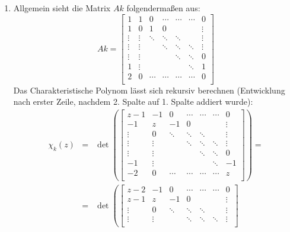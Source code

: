 \begin{enumerate}
\item Allgemein sieht die Matrix $Ak$ folgendermaßen aus:
	\[ Ak = \begin{bmatrix}
			1      & 1      & 0      & \cdots & \cdots & \cdots & 0      \\
			1      & 0      & 1      & 0      &        &        & \vdots \\
			\vdots & \vdots & \ddots & \ddots & \ddots &        & \vdots \\
			\vdots & \vdots &        & \ddots & \ddots & \ddots & \vdots \\
			\vdots & \vdots &        &        & \ddots & \ddots & 0      \\
			1      & \vdots &        &        &        & \ddots & 1      \\
			2      & 0      & \cdots & \cdots & \cdots & \cdots & 0      \\
		\end{bmatrix} \]
	Das Charakteristische Polynom lässt sich rekursiv berechnen (Entwicklung nach erster Zeile,
	nachdem 2. Spalte auf 1. Spalte addiert wurde):
	\begin{eqnarray*}
		\chi_k(z) &=& \det \left(
				\begin{bmatrix}
					z-1    & -1     & 0      & \cdots & \cdots & \cdots & 0      \\
					-1     & z      & -1     & 0      &        &        & \vdots \\
					\vdots & 0      & \ddots & \ddots & \ddots &        & \vdots \\
					\vdots & \vdots &        & \ddots & \ddots & \ddots & \vdots \\
					\vdots & \vdots &        &        & \ddots & \ddots & 0      \\
					-1     & \vdots &        &        &        & \ddots & -1     \\
					-2     & 0      & \cdots & \cdots & \cdots & \cdots & z      \\
				\end{bmatrix} \right) = \\
			&=& \det \left(
				\begin{bmatrix}
					z-2    & -1     & 0      & \cdots & \cdots & \cdots & 0      \\
					z-1    & z      & -1     & 0      &        &        & \vdots \\
					\vdots & 0      & \ddots & \ddots & \ddots &        & \vdots \\
					\vdots & \vdots &        & \ddots & \ddots & \ddots & \vdots \\

\end{bmatrix}
\end{eqnarray*}
\end{enumerate}
